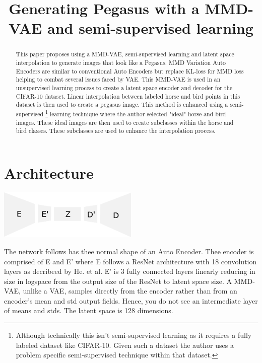 \documentclass{article}
\title{Generating Pegasus with a MMD-VAE and semi-supervised learning}
\begin{document}
\maketitle
\begin{abstract}
    This paper proposes using a MMD-VAE, semi-supervised learning and latent space interpolation to generate images that look like a Pegasus. MMD Variation Auto Encoders are similar to conventional Auto Encoders but replace KL-loss for MMD loss helping to combat several issues faced by VAE. This MMD-VAE is used in an unsupervised learning process to create a latent space encoder and decoder for the CIFAR-10 dataset. Linear interpolation between labeled horse and bird points in this dataset is then used to create a pegasus image. This method is enhanced using a semi-supervised \footnote{Although technically this isn't semi-supervised learning as it requires a fully labeled dataset like CIFAR-10. Given such a dataset the author uses a problem specific semi-supervised technique within that dataset.} learning technique where the author selected "ideal" horse and bird images. These ideal images are then used to create subclasses within the horse and bird classes. These subclasses are used to enhance the interpolation process.

\end{abstract}

\section{Architecture}
\begin{center}
    \includegraphics[width=0.5\textwidth]{figures/Encoder.png}
\end{center}
The network follows has thee normal shape of an Auto Encoder.
Thee encoder is comprised of E and E' where E follows a ResNet \cite{ResNet} architecture with 18 convolution layers as decribeed by He. et al. E' is 3 fully connected layers linearly reducing in size in logspace from the output size of the ResNet to latent space size. A MMD-VAE, unlike a VAE, samples directly from the encoder rather than from an encoder's mean and std output fields. Hence, you do not see an intermediate layer of means and stds. The latent space is 128 dimensions. 
\end{document}
